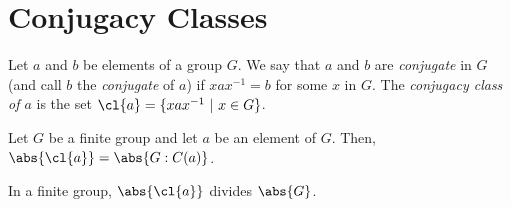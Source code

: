\section{Conjugacy Classes}

\begin{definition}
	Let $a$ and $b$ be elements of a group $G$. We say that $a$ and $b$ are \textit{conjugate} in $G$ (and call $b$ the \textit{conjugate} of $a$) if $xax^{-1}=b$ for some $x$ in $G$. The \textit{conjugacy class of $a$} is the set $\cl{a} = \{xax^{-1}\ \vert\ x \in G\}$.
\end{definition}

\begin{theorem}
	Let $G$ be a finite group and let $a$ be an element of $G$. Then, $\abs{\cl{a}} = \abs{G:C(a)}$.
\end{theorem}

\begin{corollary}
	In a finite group, $\abs{\cl{a}}$ divides $\abs{G}$.
\end{corollary}
